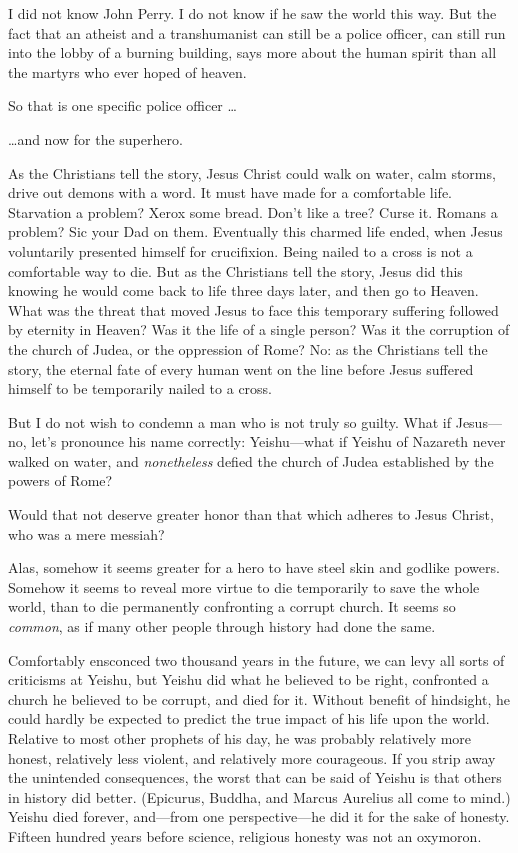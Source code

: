 {
 I did not know John Perry. I do not know if he saw the world this
way. But the fact that an atheist and a transhumanist can still be a
police officer, can still run into the lobby of a burning building,
says more about the human spirit than all the martyrs who ever hoped of
heaven.}

{
 So that is one specific police officer \ldots}

{
 \ldots and now for the superhero.}

{
 As the Christians tell the story, Jesus Christ could walk on
water, calm storms, drive out demons with a word. It must have made for
a comfortable life. Starvation a problem? Xerox some bread.
Don't like a tree? Curse it. Romans a problem? Sic your
Dad on them. Eventually this charmed life ended, when Jesus voluntarily
presented himself for crucifixion. Being nailed to a cross is not a
comfortable way to die. But as the Christians tell the story, Jesus did
this knowing he would come back to life three days later, and then go
to Heaven. What was the threat that moved Jesus to face this temporary
suffering followed by eternity in Heaven? Was it the life of a single
person? Was it the corruption of the church of Judea, or the oppression
of Rome? No: as the Christians tell the story, the eternal fate of
every human went on the line before Jesus suffered himself to be
temporarily nailed to a cross.}

{
 But I do not wish to condemn a man who is not truly so guilty.
What if Jesus---no, let's pronounce his name correctly:
Yeishu---what if Yeishu of Nazareth never walked on water, and
\textit{nonetheless} defied the church of Judea established by the
powers of Rome?}

{
 Would that not deserve greater honor than that which adheres to
Jesus Christ, who was a mere messiah?}

{
 Alas, somehow it seems greater for a hero to have steel skin and
godlike powers. Somehow it seems to reveal more virtue to die
temporarily to save the whole world, than to die permanently
confronting a corrupt church. It seems so \textit{common}, as if many
other people through history had done the same.}

{
 Comfortably ensconced two thousand years in the future, we can
levy all sorts of criticisms at Yeishu, but Yeishu did what he believed
to be right, confronted a church he believed to be corrupt, and died
for it. Without benefit of hindsight, he could hardly be expected to
predict the true impact of his life upon the world. Relative to most
other prophets of his day, he was probably relatively more honest,
relatively less violent, and relatively more courageous. If you strip
away the unintended consequences, the worst that can be said of Yeishu
is that others in history did better. (Epicurus, Buddha, and Marcus
Aurelius all come to mind.) Yeishu died forever, and---from one
perspective---he did it for the sake of honesty. Fifteen hundred years
before science, religious honesty was not an oxymoron.}


